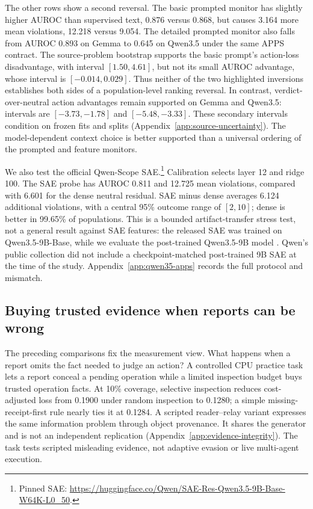The other rows show a second reversal. The basic prompted monitor has slightly
higher AUROC than supervised text, 0.876 versus 0.868, but causes 3.164 more
mean violations, 12.218 versus 9.054. The detailed prompted monitor also falls
from AUROC 0.893 on Gemma to 0.645 on Qwen3.5 under the same APPS contract.
The source-problem bootstrap supports the basic prompt's action-loss
disadvantage, with interval $[1.50,4.61]$, but not its small AUROC advantage,
whose interval is $[-0.014,0.029]$. Thus neither of the two highlighted
inversions establishes both sides of a population-level ranking reversal.
In contrast, verdict-over-neutral action advantages remain supported on
Gemma and Qwen3.5: intervals are $[-3.73,-1.78]$ and $[-5.48,-3.33]$.
These secondary intervals condition on frozen fits and splits
(Appendix~\ref{app:source-uncertainty}). The model-dependent context choice is
better supported than a universal ordering of the prompted and feature monitors.

We also test the official Qwen-Scope SAE.\footnote{Pinned SAE:
\url{https://huggingface.co/Qwen/SAE-Res-Qwen3.5-9B-Base-W64K-L0_50}.}
Calibration selects layer 12 and ridge 100. The SAE probe has AUROC 0.811 and
12.725 mean violations, compared with 6.601 for the dense neutral residual.
SAE minus dense averages 6.124 additional violations, with a central 95\%
outcome range of $[2,10]$; dense is better in 99.65\% of populations. This is a
bounded artifact-transfer stress test, not a general result against SAE features:
the released SAE was trained on Qwen3.5-9B-Base, while we evaluate the
post-trained Qwen3.5-9B model \cite{deng2026qwenscope}. Qwen's public
collection did not include a checkpoint-matched post-trained 9B SAE at the
time of the study. Appendix~\ref{app:qwen35-apps} records the full protocol
and mismatch.

\subsection{Buying trusted evidence when reports can be wrong}

The preceding comparisons fix the measurement view. What happens when a
report omits the fact needed to judge an action? A controlled CPU practice task
lets a report conceal a pending operation while a limited inspection budget
buys trusted operation facts. At 10\% coverage, selective inspection reduces
cost-adjusted loss from 0.1900 under random inspection to 0.1280; a simple
missing-receipt-first rule nearly ties it at 0.1284. A scripted reader--relay
variant expresses the same information problem through object provenance.
It shares the generator and is not an independent replication
(Appendix~\ref{app:evidence-integrity}). The task tests scripted misleading
evidence, not adaptive evasion or live multi-agent execution.

